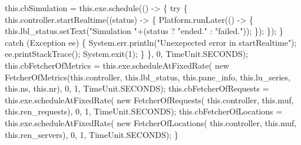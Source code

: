   this.cbSimulation = this.exe.schedule(() -> \{
    try \{
      this.controller.startRealtime((status) -> \{
        Platform.runLater(() -> \{
          this.lbl_status.setText("Simulation "+(status ? "ended." : "failed."));
        \});
      \});
    \} catch (Exception ee) \{
      System.err.println("Unexepected error in startRealtime");
      ee.printStackTrace();
      System.exit(1);
    \}
  \}, 0, TimeUnit.SECONDS);
  this.cbFetcherOfMetrics = this.exe.scheduleAtFixedRate(
      new FetcherOfMetrics(this.controller, this.lbl_status, this.pane_info, this.lu_series, this.ns, this.nr), 0, 1, TimeUnit.SECONDS);
  this.cbFetcherOfRequests = this.exe.scheduleAtFixedRate(
      new FetcherOfRequests(
        this.controller, this.muf, this.ren_requests), 0, 1, TimeUnit.SECONDS);
  this.cbFetcherOfLocations = this.exe.scheduleAtFixedRate(
      new FetcherOfLocations(
        this.controller, this.muf, this.ren_servers), 0, 1, TimeUnit.SECONDS);
\}
\eatline
{}\nwendcode{}\nwdocspar
